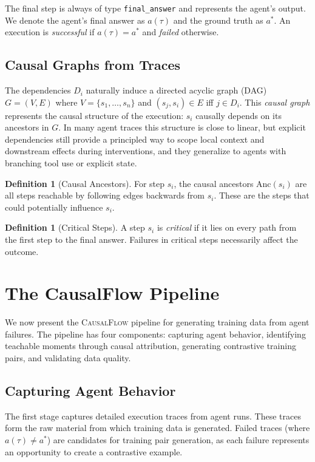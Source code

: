 \documentclass{article}
\theoremstyle{plain}
\theoremstyle{definition}
\newtheorem{definition}[theorem]{Definition}
\theoremstyle{remark}
\begin{document}
The final step is always of type \texttt{final\_answer} and represents the agent's output. We denote the agent's final answer as $a(\tau)$ and the ground truth as $a^*$. An execution is \emph{successful} if $a(\tau) = a^*$ and \emph{failed} otherwise.

\subsection{Causal Graphs from Traces}

The dependencies $D_i$ naturally induce a directed acyclic graph (DAG) $G = (V, E)$ where $V = \{s_1, \ldots, s_n\}$ and $(s_j, s_i) \in E$ iff $j \in D_i$. This \emph{causal graph} represents the causal structure of the execution: $s_i$ causally depends on its ancestors in $G$.
In many agent traces this structure is close to linear, but explicit dependencies still provide a principled way to scope local context and downstream effects during interventions, and they generalize to agents with branching tool use or explicit state.

\begin{definition}[Causal Ancestors]
For step $s_i$, the causal ancestors $\text{Anc}(s_i)$ are all steps reachable by following edges backwards from $s_i$. These are the steps that could potentially influence $s_i$.
\end{definition}

\begin{definition}[Critical Steps]
A step $s_i$ is \emph{critical} if it lies on every path from the first step to the final answer. Failures in critical steps necessarily affect the outcome.
\end{definition}


\section{The CausalFlow Pipeline}

We now present the \textsc{CausalFlow} pipeline for generating training data from agent failures. The pipeline has four components: capturing agent behavior, identifying teachable moments through causal attribution, generating contrastive training pairs, and validating data quality.

\subsection{Capturing Agent Behavior}

The first stage captures detailed execution traces from agent runs. These traces form the raw material from which training data is generated. Failed traces (where $a(\tau) \neq a^*$) are candidates for training pair generation, as each failure represents an opportunity to create a contrastive example.
\end{document}
